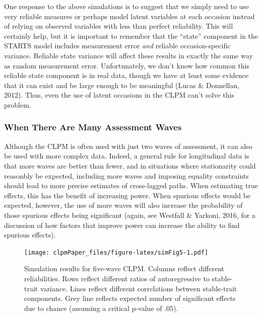 \documentclass[
  english,
  man,floatsintext]{apa6}
\begin{document}
One response to the above simulations is to suggest that we simply need to use very reliable measures or perhaps model latent variables at each occasion instead of relying on observed variables with less than perfect reliability. This will certainly help, but it is important to remember that the ``state'' component in the STARTS model includes measurement error \emph{and} reliable occasion-specific variance. Reliable state variance will affect these results in exactly the same way as random measurement error. Unfortunately, we don't know how common this reliable state component is in real data, though we have at least some evidence that it can exist and be large enough to be meaningful (Lucas \& Donnellan, 2012). Thus, even the use of latent occasions in the CLPM can't solve this problem.

\hypertarget{when-there-are-many-assessment-waves}{%
\subsubsection{When There Are Many Assessment Waves}\label{when-there-are-many-assessment-waves}}

Although the CLPM is often used with just two waves of assessment, it can also be used with more complex data. Indeed, a general rule for longitudinal data is that more waves are better than fewer, and in situations where stationarity could reasonbly be expected, including more waves and imposing equality constraints should lead to more precise estimates of cross-lagged paths. When estimating true effects, this has the benefit of increasing power. When spurious effects would be expected, however, the use of more waves will also increase the probability of those spurious effects being significant (again, see Westfall \& Yarkoni, 2016, for a discussion of how factors that improve power can increase the ability to find spurious effects).

\begin{figure}
\centering
\texttt{[image: clpmPaper\_files/figure-latex/simFig5-1.pdf]}
\caption{\label{fig:simFig5}Simulation results for five-wave CLPM. Columns reflect different reliabilities. Rows reflect different ratios of autoregressive to stable-trait variance. Lines reflect different correlations between stable-trait components. Grey line reflects expected number of significant effects due to chance (assuming a critical p-value of .05).}
\end{figure}
\end{document}
